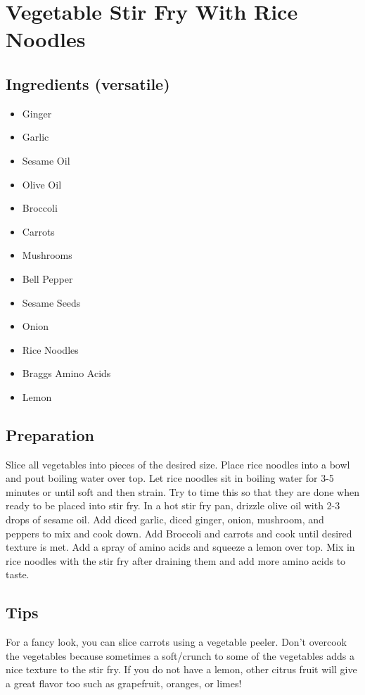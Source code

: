 \thispagestyle{fancy}
\section{Vegetable Stir Fry With Rice Noodles}
\AddToShipoutPicture*{\StirFryRiceNoodles}

\subsection*{Ingredients (versatile)}
\begin{multicols}{3}
	\begin{itemize}
		\item Ginger
		\item Garlic
		\item Sesame Oil
		\item Olive Oil
		\item Broccoli
		\item Carrots
		\item Mushrooms
		\item Bell Pepper
		\item Sesame Seeds
		\item Onion
		\item Rice Noodles
		\item Braggs Amino Acids
		\item Lemon
	\end{itemize}
\end{multicols}

\subsection*{Preparation}

Slice all vegetables into pieces of the desired size. Place rice noodles into a bowl and pout boiling water over top. Let rice noodles sit in boiling water for 3-5 minutes or until soft and then strain. Try to time this so that they are done when ready to be placed into stir fry. In a hot stir fry pan, drizzle olive oil with 2-3 drops of sesame oil. Add diced garlic, diced ginger, onion, mushroom, and peppers to mix and cook down. Add Broccoli and carrots and cook until desired texture is met. Add a spray of amino acids and squeeze a lemon over top. Mix in rice noodles with the stir fry after draining them and add more amino acids to taste. 

\subsection*{Tips}

For a fancy look, you can slice carrots using a vegetable peeler. Don't overcook the vegetables because sometimes a soft/crunch to some of the vegetables adds a nice texture to the stir fry. If you do not have a lemon, other citrus fruit will give a great flavor too such as grapefruit, oranges, or limes!